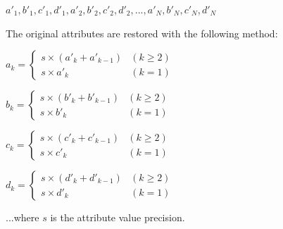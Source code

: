 $a'_1, b'_1, c'_1, d'_1, a'_2, b'_2, c'_2, d'_2, ..., a'_N, b'_N, c'_N, d'_N$

The original attributes are restored with the following method:

$a_k = \begin{cases}
s \times (a'_k + a'_{k-1}) & (k \geq 2)\\
s \times a'_k & (k = 1)
\end{cases}$

$b_k = \begin{cases}
s \times (b'_k + b'_{k-1}) & (k \geq 2)\\
s \times b'_k & (k = 1)
\end{cases}$

$c_k = \begin{cases}
s \times (c'_k + c'_{k-1}) & (k \geq 2)\\
s \times c'_k & (k = 1)
\end{cases}$

$d_k = \begin{cases}
s \times (d'_k + d'_{k-1}) & (k \geq 2)\\
s \times d'_k & (k = 1)
\end{cases}$

...where $s$ is the attribute value precision.


